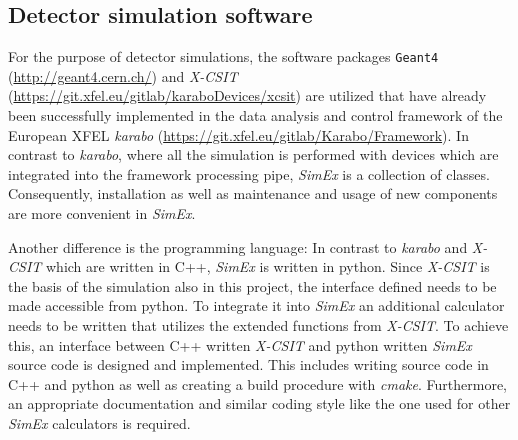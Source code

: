 \subsection{Detector simulation software}
For the purpose of detector simulations, the software packages \texttt{Geant4}
(\url{http://geant4.cern.ch/}) and \textit{X-CSIT}
(\url{https://git.xfel.eu/gitlab/karaboDevices/xcsit}) are utilized that have
already been successfully implemented in the data analysis and control framework
of the European XFEL \textit{karabo}
(\url{https://git.xfel.eu/gitlab/Karabo/Framework}). In contrast to
\textit{karabo}, where all the simulation is performed with devices which are
integrated into the framework processing pipe, \textit{SimEx} is a collection of
classes. Consequently,  installation as well as
maintenance and usage of new components are more convenient in \textit{SimEx}.


Another difference is the programming language:
In contrast to \textit{karabo} and \textit{X-CSIT} which are
written in C++, \textit{SimEx} is written in python. Since \textit{X-CSIT} is
the basis of the simulation also in this project, the interface defined needs to
be made accessible from python. To integrate it into \textit{SimEx} an
additional calculator needs to be written that utilizes the extended functions
from \textit{X-CSIT}. To achieve this, an interface between C++ written
\textit{X-CSIT} and python written \textit{SimEx} source code is designed and
implemented. This includes writing source code in C++ and python as well as
creating a build procedure with \textit{cmake}. Furthermore, an appropriate
documentation and similar coding style like the one used for other
\textit{SimEx} calculators is required.

